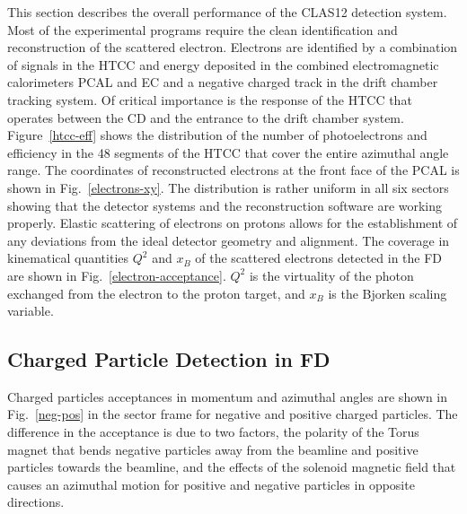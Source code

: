 \documentclass[final,3p,twocolumn]{elsarticle}
\begin{document}
This section describes the overall performance of the CLAS12 detection system. Most of the experimental programs
require the clean identification and reconstruction of the scattered electron. Electrons are identified by a combination
of signals in the HTCC and energy deposited in the combined electromagnetic calorimeters PCAL and EC and a negative
charged track in the drift chamber tracking system. Of critical importance is the response of the HTCC that operates
between the CD and the entrance to the drift chamber system. Figure~\ref{htcc-eff} shows the distribution of the
number of photoelectrons and efficiency in the 48 segments of the HTCC that cover the entire azimuthal angle range. 
The coordinates of reconstructed electrons at the front face of the PCAL is shown in Fig.~\ref{electrons-xy}. The
distribution is rather uniform in all six sectors showing that the detector systems and the reconstruction software are
working properly. Elastic scattering  of electrons on protons allows for the establishment of any deviations from the ideal
detector geometry and alignment. The coverage in kinematical quantities $Q^2$ and $x_B$ of the scattered electrons
detected in the FD are shown in Fig.~\ref{electron-acceptance}. $Q^2$ is the virtuality of the photon exchanged from
the electron to the proton target, and $x_B$ is the Bjorken scaling variable.

\subsection{Charged Particle Detection in FD}
 
 Charged particles acceptances in momentum and azimuthal angles are shown in Fig.~\ref{neg-pos} in the sector frame for negative and positive charged particles. The difference in the acceptance is due to two factors, the polarity of the Torus magnet that bends negative particles away from the beamline and positive particles towards the beamline, and the effects of the solenoid magnetic field that causes an azimuthal motion for positive and negative particles in opposite directions. 
\end{document}

